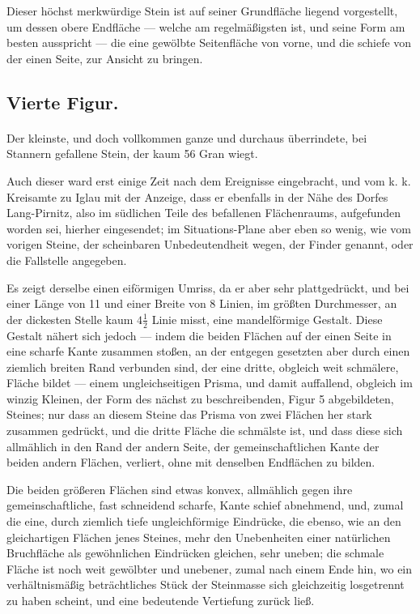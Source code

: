 \documentclass[a4paper, 11pt, oneside, german]{article}
\begin{document}
Dieser höchst merkwürdige Stein ist auf seiner Grundfläche liegend vorgestellt, um dessen obere Endfläche --- welche am regelmäßigsten ist, und seine Form am besten ausspricht --- die eine gewölbte Seitenfläche von vorne, und die schiefe von der einen Seite, zur Ansicht zu bringen.

\subsection{Vierte Figur.}
\paragraph{}
Der kleinste, und doch vollkommen ganze und durchaus überrindete, bei Stannern gefallene Stein, der kaum 56 Gran wiegt.

Auch dieser ward erst einige Zeit nach dem Ereignisse eingebracht, und vom k. k. Kreisamte zu Iglau mit der Anzeige, dass er ebenfalls in der Nähe des Dorfes Lang-Pirnitz, also im südlichen Teile des befallenen Flächenraums, aufgefunden worden sei, hierher eingesendet; im Situations-Plane aber eben so wenig, wie vom vorigen Steine, der scheinbaren Unbedeutendheit wegen, der Finder genannt, oder die Fallstelle angegeben.

Es zeigt derselbe einen eiförmigen Umriss, da er aber sehr plattgedrückt, und bei einer Länge von 11 und einer Breite von 8 Linien, im größten Durchmesser, an der dickesten Stelle kaum $4\frac{1}{2}$ Linie misst, eine mandelförmige Gestalt. Diese Gestalt nähert sich jedoch --- indem die beiden Flächen auf der einen Seite in eine scharfe Kante zusammen stoßen, an der entgegen gesetzten aber durch einen ziemlich breiten Rand verbunden sind, der eine dritte, obgleich weit schmälere, Fläche bildet --- einem ungleichseitigen Prisma, und damit auffallend, obgleich im winzig Kleinen, der Form des nächst zu beschreibenden, Figur 5 abgebildeten, Steines; nur dass an diesem Steine das Prisma von zwei Flächen her stark zusammen gedrückt, und die dritte Fläche die schmälste ist, und dass diese sich allmählich in den Rand der andern Seite, der gemeinschaftlichen Kante der beiden andern Flächen, verliert, ohne mit denselben Endflächen zu bilden.

Die beiden größeren Flächen sind etwas konvex, allmählich gegen ihre gemeinschaftliche, fast schneidend scharfe, Kante schief abnehmend, und, zumal die eine, durch ziemlich tiefe ungleichförmige Eindrücke, die ebenso, wie an den gleichartigen Flächen jenes Steines, mehr den Unebenheiten einer natürlichen Bruchfläche als gewöhnlichen Eindrücken gleichen, sehr uneben; die schmale Fläche ist noch weit gewölbter und unebener, zumal nach einem Ende hin, wo ein verhältnismäßig beträchtliches Stück der Steinmasse sich gleichzeitig losgetrennt zu haben scheint, und eine bedeutende Vertiefung zurück ließ.
\end{document}
